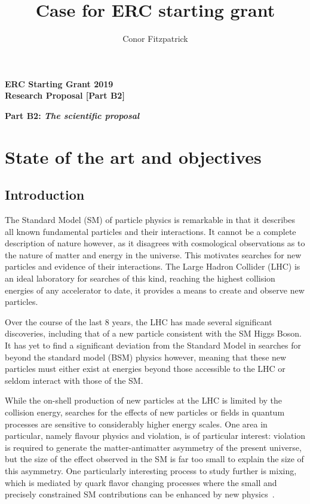 \documentclass[11pt,a4paper]{article}
\title{{\Large Case for ERC starting grant}}
\author{{\normalsize Conor Fitzpatrick}}
\date{}                                           %
\begin{document}
\begin{center} 

{\Large\bf ERC Starting Grant 2019} \\
 {\Large\bf Research Proposal [Part B2]}  \\
\vspace{2cm} 
\end{center} 

{\Large{\bf Part B2: {\it{The scientific proposal}}}}

\section{State of the art and objectives}
%


\subsection*{Introduction}
The Standard Model (SM) of particle physics is remarkable in that it describes all known fundamental particles and their interactions. It cannot be a complete description of nature however, as it disagrees with cosmological observations as to the nature of matter and energy in the universe. This motivates searches for new particles and evidence of their interactions. The Large Hadron Collider (LHC) is an ideal laboratory for searches of this kind, reaching the highest collision energies of any accelerator to date, it provides a means to create and observe new particles. 

Over the course of the last 8 years, the LHC has made several significant discoveries, including that of a new particle consistent with the SM Higgs Boson. It has yet to find a significant deviation from the Standard Model in searches for beyond the standard model (BSM) physics however, meaning that these new particles must either exist at energies beyond those accessible to the LHC or seldom interact with those of the SM. 

While the on-shell production of new particles at the LHC is limited by the collision energy,  searches for the effects of new particles or fields in quantum processes are sensitive to considerably higher energy scales. One area in particular, namely flavour physics and \CP violation, is of particular interest: \CP violation is required to generate the matter-antimatter asymmetry of the present universe, but the size of the effect observed in the SM is far too small to explain the size of this asymmetry. 
One particularly interesting process to study further is \HepProcess{\PBs-\APBs} mixing, which is mediated by quark flavor changing processes where the small and precisely constrained SM contributions can be enhanced by new physics~\cite{Lenz:2010gu}.
\end{document}
